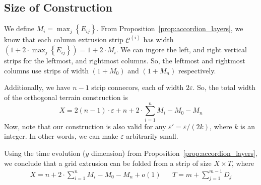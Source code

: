 \subsection{Size of Construction}
\label{sec:size}

We define $M_i = \max_j\left\{ E_{ij}\right\}$.
From Proposition~\ref{prop:accordion_layers}, we know that each column extrusion strip
$\mathcal C^{(i)}$ has width $\left( 1 + 2\cdot\max_j\left\{ E_{ij}\right\}\right) = 1+2\cdot M_i$.
We can ingore the left, and right vertical strips for the leftmost, and rightmost columns.
So, the leftmost and rightmost columns use strips of width $(1 + M_0)$ and $(1 + M_n)$ respectively.

Additionally, we have $n-1$ strip connecors, each of width $2\varepsilon$.
So, the total width of the orthogonal terrain construction is
$$X = 2(n-1)\cdot\varepsilon + n + 2\cdot\sum\limits_{i=1}^n M_i - M_0 - M_n$$
Now, note that our construction is also valid for any $\varepsilon' = \varepsilon/(2k)$, where $k$ is an integer.
In other words, we can make $\varepsilon$ arbitrarily small.

\begin{theorem}
\label{thm:grid_extrusion}
Using the time evolution ($y$ dimension) from Proposition~\ref{prop:accordion_layers},
we conclude that a grid extrusion can be folded from a strip of size $X\times T$, where
\begin{align}
X = n + 2\cdot\sum\limits_{i=1}^n M_i - M_0 - M_n + o(1) && T = m + \sum\limits^{m-1}_{j=1} D_j
\end{align}
\end{theorem}

